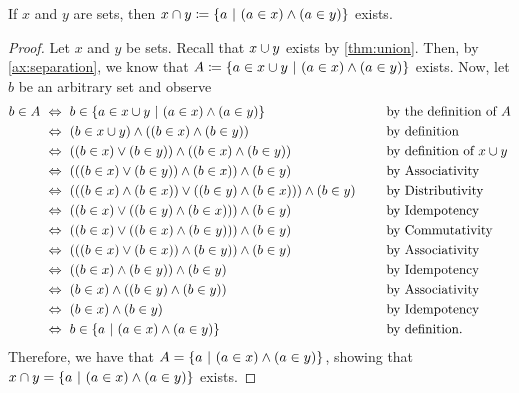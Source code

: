 \begin{theorem}\label{thm:intersection}
    If $x$ and $y$ are sets,
    then $x \intersect y \defn \set*{a \suchthat (a \in x) \meet (a \in y)}$ exists.
\end{theorem}
\begin{proof}
    Let $x$ and $y$ be sets. Recall that $x \cup y$ exists by \autoref{thm:union}.
    Then, by \autoref{ax:separation},
    we know that $A \defn \set*{a \in x \union y \suchthat (a \in x) \meet (a \in y)}$ exists.
    Now, let $b$ be an arbitrary set and observe
    \begin{alignat*}{2}
        b \in A &\iff b \in \set*{a \in x \union y \suchthat (a \in x) \meet (a \in y)} &&\text{by the definition of $A$} \\
                &\iff (b \in x \union y) \meet \pn*{(b \in x) \meet (b \in y)} &&\text{by definition} \\
                &\iff \pn*{(b \in x) \join (b \in y)} \meet \pn*{(b \in x) \meet (b \in y)} &&\text{by definition of } x \union y \\
                &\iff \pn*{\pn*{(b \in x) \join (b \in y)} \meet (b \in x)} \meet (b \in y) &&\text{by Associativity} \\
                &\iff \pn*{\pn*{(b \in x) \meet (b \in x)} \join \pn*{(b \in y) \meet (b \in x)}} \meet (b \in y)~~~~&&\text{by Distributivity} \\
                &\iff \pn*{(b \in x) \join \pn*{(b \in y) \meet (b \in x)}} \meet (b \in y) &&\text{by Idempotency} \\
                &\iff \pn*{(b \in x) \join \pn*{(b \in x) \meet (b \in y)}} \meet (b \in y) &&\text{by Commutativity} \\
                &\iff \pn*{\pn*{(b \in x) \join (b \in x)} \meet (b \in y)} \meet (b \in y) &&\text{by Associativity} \\
                &\iff \pn*{(b \in x) \meet (b \in y)} \meet (b \in y) &&\text{by Idempotency} \\
                &\iff (b \in x) \meet \pn*{(b \in y) \meet (b \in y)} &&\text{by Associativity} \\
                &\iff (b \in x) \meet (b \in y) &&\text{by Idempotency} \\
                &\iff b \in \set*{a \suchthat (a \in x) \meet (a \in y)} &&\text{by definition}.
    \end{alignat*}
    Therefore, we have that $A = \set*{a \suchthat (a \in x) \meet (a \in y)}$,
    showing that $x \intersect y = \set*{a \suchthat (a \in x) \meet (a \in y)}$ exists.
\end{proof}

